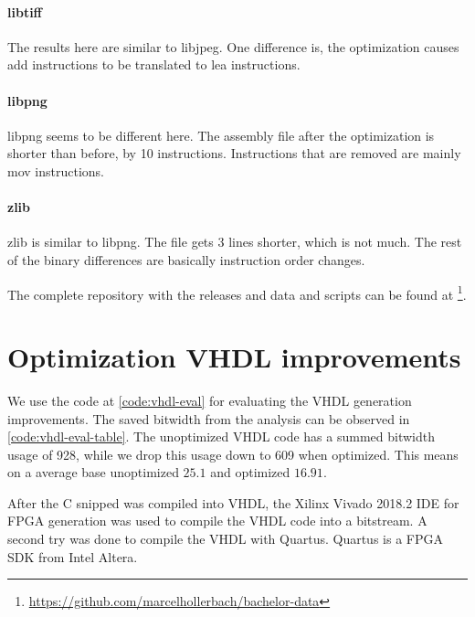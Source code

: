 \paragraph{libtiff} The results here are similar to libjpeg. One difference is, the optimization causes add instructions to be translated to lea instructions. 

\paragraph{libpng} libpng seems to be different here. The assembly file after the optimization is shorter than before, by 10 instructions. Instructions that are removed are mainly mov instructions.

\paragraph{zlib} zlib is similar to libpng. The file gets 3 lines shorter, which is not much. The rest of the binary differences are basically instruction order changes.

The complete repository with the releases and data and scripts can be found at \footnote{\url{https://github.com/marcelhollerbach/bachelor-data}}.

\section{Optimization VHDL improvements}


We use the code at \autoref{code:vhdl-eval} for evaluating the VHDL generation improvements. The saved bitwidth from the analysis can be observed in \autoref{code:vhdl-eval-table}. The unoptimized VHDL code has a summed bitwidth usage of 928, while we drop this usage down to 609 when optimized. This means on a average base unoptimized $25.1$ and optimized $16.91$.

After the C snipped was compiled into VHDL, the Xilinx Vivado 2018.2 IDE for FPGA generation was used to compile the VHDL code into a bitstream. A second try was done to compile the VHDL with Quartus. Quartus is a FPGA SDK from Intel Altera.

